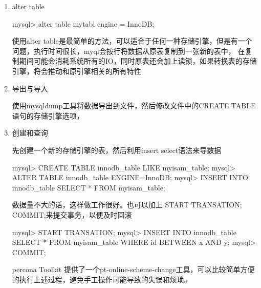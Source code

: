 \documentclass[cyan]{article}
\begin{document}
\begin{enumerate}
\item alter table

mysql> alter table mytabl engine = InnoDB;

使用alter table是最简单的方法，可以适合于任何一种存储引擎，但是有一个问题，执行时间很长，myql会按行将数据从原表复制到一张新的表中，
在复制期间可能会消耗系统所有的IO，同时原表还会加上读锁，如果转换表的存储引擎，将会推动和原引擎相关的所有特性

\item 导出与导入

使用mysqldump工具将数据导出到文件，然后修改文件中的CREATE TABLE 语句的存储引擎选项，

\item 创建和查询

先创建一个新的存储引擎的表，然后利用insert select语法来导数据

mysql> CREATE TABLE innodb_table LIKE myisam_table;
mysql> ALTER TABLE innodb_table ENGINE=InnoDB;
mysql> INSERT INTO innodb_table SELECT * FROM myisam_table;

数据量不大的话，这样做工作很好。也可以加上 START TRANSATION;  COMMIT;来提交事务，以便及时回滚

mysql> START TRANSATION;
mysql> INSERT INTO innodb_table SELECT * FROM myisam_table WHERE id BETWEEN x AND y;
mysql> COMMIT;

percona Toolkit 提供了一个pt-online-scheme-change工具，可以比较简单方便的执行上述过程，避免手工操作可能导致的失误和烦琐。
\end{enumerate}
\end{document}

